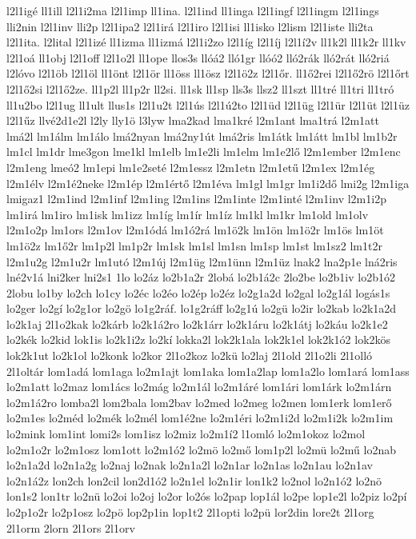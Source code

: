 {l2l1igé
ll1ill
l2l1i2ma
l2l1imp
ll1ina.
l2l1ind
ll1inga
l2l1ingf
l2l1ingm
l2l1ings
lli2nin
l2l1inv
lli2p
l2l1ipa2
l2l1irá
l2l1iro
l2l1isi
ll1isko
l2lism
l2l1iste
lli2ta
l2l1ita.
l2lital
l2l1izé
ll1izma
ll1izmá
l2l1i2zo
l2l1íg
l2l1íj
l2l1í2v
ll1k2l
ll1k2r
ll1kv
l2l1oá
ll1obj
l2l1off
l2l1o2l
ll1ope
llos3s
llóá2
lló1gr
llóó2
lló2rák
lló2rát
lló2riá
l2lóvo
l2l1öb
l2l1öl
ll1önt
l2l1ör
ll1öss
ll1ösz
l2l1ö2z
l2l1őr.
ll1ő2rei
l2l1ő2rö
l2l1őrt
l2l1ő2si
l2l1ő2ze.
ll1p2l
ll1p2r
ll2si.
ll1sk
ll1sp
lls3s
llsz2
ll1szt
ll1tré
ll1tri
ll1tró
ll1u2bo
l2l1ug
ll1ult
llus1s
l2l1u2t
l2l1ús
l2l1ú2to
l2l1üd
l2l1üg
l2l1ür
l2l1üt
l2l1üz
l2l1űz
llvé2d1e2l
l2ly
lly1ö
l3lyw
lma2kad
lma1kré
l2m1ant
lma1trá
l2m1att
lmá2l
lm1álm
lm1álo
lmá2nyan
lmá2ny1út
lmá2ris
lm1átk
lm1átt
lm1bl
lm1b2r
lm1cl
lm1dr
lme3gon
lme1kl
lm1elb
lm1e2li
lm1elm
lm1e2lő
l2m1ember
l2m1enc
l2m1eng
lmeó2
lm1epi
lm1e2seté
l2m1essz
l2m1etn
l2m1etű
l2m1ex
l2m1ég
l2m1élv
l2m1é2neke
l2m1ép
l2m1értő
l2m1éva
lm1gl
lm1gr
lm1i2dő
lmi2g
l2m1iga
lmigaz1
l2m1ind
l2m1inf
l2m1ing
l2m1ins
l2m1inte
l2m1inté
l2m1inv
l2m1i2p
lm1irá
lm1iro
lm1isk
lm1izz
lm1íg
lm1ír
lm1íz
lm1kl
lm1kr
lm1old
lm1olv
l2m1o2p
lm1ors
l2m1ov
l2m1ódá
lm1ó2rá
lm1ö2k
lm1ön
lm1ö2r
lm1ös
lm1öt
lm1ö2z
lm1ő2r
lm1p2l
lm1p2r
lm1sk
lm1sl
lm1sn
lm1sp
lm1st
lm1sz2
lm1t2r
l2m1u2g
l2m1u2r
lm1utó
l2m1új
l2m1üg
l2m1ünn
l2m1üz
lnak2
lna2p1e
lná2ris
lné2v1á
lni2ker
lni2s1
1lo
lo2áz
lo2b1a2r
2lobá
lo2b1á2c
2lo2be
lo2b1iv
lo2b1ó2
2lobu
lo1by
lo2ch
lo1cy
lo2éc
lo2éo
lo2ép
lo2éz
lo2g1a2d
lo2gal
lo2g1ál
logás1s
lo2ger
lo2gí
lo2g1or
lo2gö
lo1g2ráf.
lo1g2ráff
lo2g1ú
lo2gü
lo2ir
lo2kab
lo2k1a2d
lo2k1aj
2l1o2kak
lo2kárb
lo2k1á2ro
lo2k1árr
lo2k1áru
lo2k1átj
lo2káu
lo2k1e2
lo2kék
lo2kid
lok1is
lo2k1i2z
lo2kí
lokka2l
lok2k1ala
lok2k1el
lok2k1ó2
lok2kös
lok2k1ut
lo2k1ol
lo2konk
lo2kor
2l1o2koz
lo2kü
lo2laj
2l1old
2l1o2li
2l1olló
2l1oltár
lom1adá
lom1aga
lo2m1ajt
lom1aka
lom1a2lap
lom1a2lo
lom1ará
lom1ass
lo2m1att
lo2maz
lom1ács
lo2mág
lo2m1ál
lo2m1áré
lom1ári
lom1árk
lo2m1árn
lo2m1á2ro
lomba2l
lom2bala
lom2bav
lo2med
lo2meg
lo2men
lom1erk
lom1erő
lo2m1es
lo2méd
lo2mék
lo2mél
lom1é2ne
lo2m1éri
lo2m1i2d
lo2m1i2k
lo2m1im
lo2mink
lom1int
lomi2s
lom1isz
lo2miz
lo2m1í2
l1omló
lo2m1okoz
lo2mol
lo2m1o2r
lo2m1osz
lom1ott
lo2m1ó2
lo2mö
lo2mő
lom1p2l
lo2mü
lo2mű
lo2nab
lo2n1a2d
lo2n1a2g
lo2naj
lo2nak
lo2n1a2l
lo2n1ar
lo2n1as
lo2n1au
lo2n1av
lo2n1á2z
lon2ch
lon2cil
lon2d1ó2
lo2n1el
lo2n1ir
lon1k2
lo2nol
lo2n1ó2
lo2nö
lon1s2
lon1tr
lo2nü
lo2oi
lo2oj
lo2or
lo2ós
lo2pap
lop1ál
lo2pe
lop1e2l
lo2piz
lo2pí
lo2p1o2r
lo2p1osz
lo2pö
lop2p1in
lop1t2
2l1opti
lo2pü
lor2din
lore2t
2l1org
2l1orm
2lorn
2l1ors
2l1orv
}
